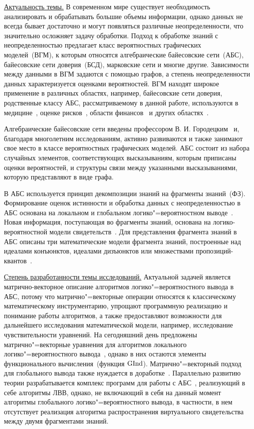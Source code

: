 \underline{Актуальность темы.} В современном мире существует необходимость анализировать и обрабатывать большие объемы информации, однако данных не всегда бывает достаточно и могут появляться различные неопределенности, что значительно осложняет задачу обработки. Подход к обработке знаний с неопределенностью предлагает класс вероятностных графических моделей~(ВГМ), к которым относятся алгебраические байесовские сети~(АБС), байесовские сети доверия~(БСД), марковские сети и многие другие. Зависимости между данными в ВГМ задаются с помощью графов, а степень неопределенности данных характеризуется оценками вероятностей. ВГМ находят широкое применение в различных областях, например, байесовские сети доверия, родственные классу АБС, рассматриваемому в данной работе, используются в медицине~\cite{99}, оценке рисков~\cite{98}, области финансов~\cite{97} и других областях~\cite{96}. 

Алгебраические байесовские сети введены профессором В. И. Городецким~\cite{95, 94} и, благодаря многолетним исследованиям, активно развиваются и также занимают свое место в классе вероятностных графических моделей. АБС состоит из набора случайных элементов, соответствующих высказываниям, которым приписаны оценки вероятностей, и структуры связи между указанными высказываниями, которую представляют в виде графа. 

В АБС используется принцип декомпозиции знаний на фрагменты знаний~(ФЗ). Формирование оценок истинности и обработка данных с неопределенностью в АБС основана на локальном и глобальном логико"=вероятностном выводе~\cite{93}. Новая информация, поступающая во фрагменты знаний, основана на логико-вероятностной модели свидетельств~\cite{109}. Для представления фрагмента знаний в АБС описаны три математические модели фрагмента знаний, построенные над идеалами конъюнктов, идеалами дизъюнктов или множествами пропозиций-квантов~\cite{121}. 
 
 \underline{Степень разработанности темы исследований.} 
 Актуальной задачей является матрично-векторное описание алгоритмов логико"=вероятностного вывода в АБС, потому что матрично"=векторные операции относятся к классическому математическому инструментарию, упрощают программную реализацию и понимание работы алгоритмов, а также предоставляют возможности для дальнейшего исследования математической модели, например, исследование чувствительности уравнений. На сегодняшний день предложены матрично"=векторные уравнения для алгоритмов локального логико"=вероятностного вывода~\cite{91}, однако в них остаются элементы функционального вычисления~(функция $\mathrm{GInd}$). Матрично"=векторный подход для глобального вывода также нуждается в доработке~\cite{70}. Параллельно развитию теории разрабатывается комплекс программ для работы с АБС~\cite{89}, реализующий в себе  алгоритмы ЛВВ, однако, не включающий в себя на данный момент алгоритмы глобального логико"=вероятностного вывода, в частности, в нем отсутствует реализация алгоритма распространения виртуального свидетельства между двумя фрагментами знаний.

